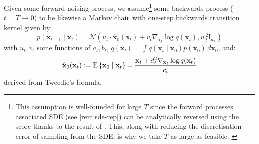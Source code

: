 \begin{definition} \label{def:backwards-process}
    Given some forward noising process, we assume\footnote{This assumption is well-founded for
    large $T$ since the forward processes associated SDE (see \autoref{rem:sde-rep}) can be
    analytically reversed using the score thanks to the result of
    \textcite{andersonReversetimeDiffusionEquation1982}. This, along with reducing the
    discretisation error of sampling from the SDE, is why we take $T$ as large as feasible.
    \label{ftnt:sde-rep}} some backwards process ($t=T \to 0$) to be likewise a Markov chain with
    one-step backwards transition kernel given by:
    \begin{equation}
        p(\mathbf{x}_{t-1} \mid \mathbf{x}_t) = \mathcal{N}\left(u_t\cdot \hat{\mathbf{x}}_0(\mathbf{x}_t) + v_t\nabla_{\mathbf{x}_t}\log q(\mathbf{x}_t), w_t^2\mathrm{I}_{d_x}\right) \label{eq:backwards-process}
    \end{equation}
    with $u_t, v_t$ some functions of $a_t, b_t$,
    $q(\mathbf{x}_t) = \int q(\mathbf{x}_t \mid \mathbf{x}_0)p(\mathbf{x}_0)\, d\mathbf{x}_0$, and:
    \begin{equation}
        \hat{\mathbf{x}}_0(\mathbf{x}_t) := \mathbb{E} \left\{ \mathbf{x}_0 \mid \mathbf{x}_t \right\} = \frac{\mathbf{x}_t + d_t^2\nabla_{\mathbf{x}_t}\log q(\mathbf{x}_t)}{c_t} \label{eq:tweedie}
    \end{equation}
    derived from Tweedie's formula.
\end{definition}

